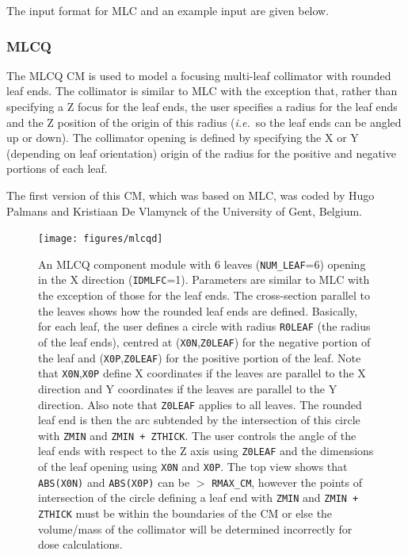 \documentclass[12pt,twoside]{article}
\newcommand{\ie}{{\em i.e.}}
\begin{document}

\clearpage

The input format for MLC and an example input are given below.
\begin{small}

\end{small}


\clearpage


\subsubsection{MLCQ}
\label{mlcq}
\renewcommand{\rightmark}{MLCQ CM}
The MLCQ CM is used to model a focusing multi-leaf collimator
with rounded leaf
ends.  The collimator is similar to MLC with the exception that, rather
than specifying a Z focus for the leaf ends, the user specifies a radius
for the leaf ends and the Z position of the origin of this radius (\ie\ so
the leaf ends can be angled up or down).  The collimator opening is defined
by specifying the X or Y (depending on leaf orientation) origin of the
radius for the positive and negative portions of each leaf.

The first version of this CM, which was based on MLC, was coded by Hugo
Palmans and Kristiaan De Vlamynck of the University of Gent, Belgium.

\newpage
\begin{figure}[tp]
\begin{center}
\leavevmode
\texttt{[image: figures/mlcqd]}
\end{center}
\caption[MLCQ CM geometry]
{An MLCQ component module with 6 leaves ({\tt NUM\_LEAF}=6) opening in the X
direction ({\tt IDMLFC}=1).  Parameters are similar to MLC with the
exception of those for the leaf ends.  The cross-section parallel to the leaves
shows how the rounded leaf ends are defined.  Basically, for each leaf, the user defines a circle
with radius {\tt R0LEAF} (the radius of the leaf ends), centred at
({\tt X0N},{\tt Z0LEAF}) for the negative portion of the leaf and
({\tt X0P},{\tt Z0LEAF}) for the positive portion of the leaf.  Note that {\tt X0N},{\tt X0P}
define X coordinates if the leaves are parallel to the X direction and Y coordinates if the
leaves are parallel to the Y direction.  Also note that {\tt Z0LEAF} applies to all leaves.
The rounded leaf end is then the arc
subtended by the intersection of this circle with {\tt ZMIN} and {\tt ZMIN + ZTHICK}.  The user
controls the angle of the leaf ends with respect to the Z axis using {\tt Z0LEAF} and the
dimensions of the leaf opening using {\tt X0N} and {\tt X0P}.
The top view shows that
{\tt ABS(X0N)} and {\tt ABS(X0P)} can be $>$ {\tt RMAX\_CM}, however the points of
intersection of the circle defining a leaf end with {\tt ZMIN} and {\tt ZMIN + ZTHICK} must
be within the boundaries of the CM or else the volume/mass of the collimator will be determined
incorrectly for dose calculations.}
\label{fig_MLCQD}
\end{figure}
\end{document}

